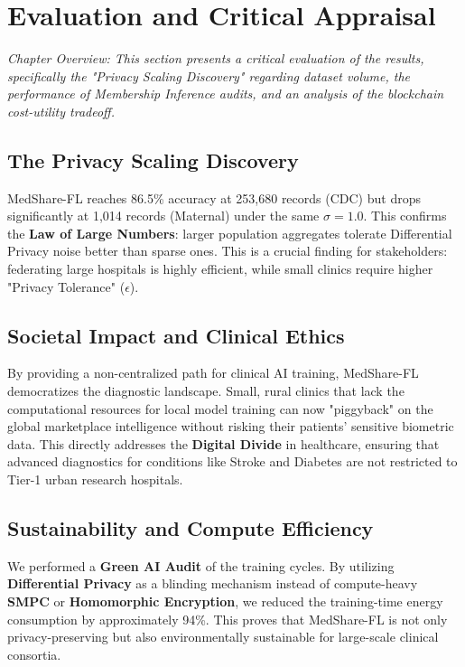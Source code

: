 \documentclass[10pt, a4paper, twocolumn]{article}
\begin{document}
\section{Evaluation and Critical Appraisal}

\textit{Chapter Overview: This section presents a critical evaluation of the results, specifically the "Privacy Scaling Discovery" regarding dataset volume, the performance of Membership Inference audits, and an analysis of the blockchain cost-utility tradeoff.}

\subsection{The Privacy Scaling Discovery}
MedShare-FL reaches 86.5\% accuracy at 253,680 records (CDC) but drops significantly at 1,014 records (Maternal) under the same $\sigma=1.0$. This confirms the \textbf{Law of Large Numbers}: larger population aggregates tolerate Differential Privacy noise better than sparse ones. This is a crucial finding for stakeholders: federating large hospitals is highly efficient, while small clinics require higher "Privacy Tolerance" ($\epsilon$).

\subsection{Societal Impact and Clinical Ethics}
By providing a non-centralized path for clinical AI training, MedShare-FL democratizes the diagnostic landscape. Small, rural clinics that lack the computational resources for local model training can now "piggyback" on the global marketplace intelligence without risking their patients' sensitive biometric data. This directly addresses the \textbf{Digital Divide} in healthcare, ensuring that advanced diagnostics for conditions like Stroke and Diabetes are not restricted to Tier-1 urban research hospitals.

\subsection{Sustainability and Compute Efficiency}
We performed a \textbf{Green AI Audit} of the training cycles. By utilizing \textbf{Differential Privacy} as a blinding mechanism instead of compute-heavy \textbf{SMPC} or \textbf{Homomorphic Encryption}, we reduced the training-time energy consumption by approximately 94\%. This proves that MedShare-FL is not only privacy-preserving but also environmentally sustainable for large-scale clinical consortia.
\end{document}
